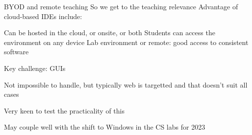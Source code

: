 \documentclass[aspectratio=169,t]{beamer}
\begin{document}
\begin{dframe}{BYOD and remote teaching}
  \1 So we get to the teaching relevance
  \1 Advantage of cloud-based IDEs include:
  
  \2 Can be hosted in the cloud, or onsite, or both
  \2 Students can access the environment on any device
  \2 Lab environment or remote: good access to consistent software

  \1 Key challenge: GUIs
  
  \2 Not impossible to handle, but typically web is targetted
  \2 and that doesn't suit all cases

  \1 Very keen to test the practicality of this
  
  \2 May couple well with the shift to Windows in the CS labs for 2023
\end{dframe}

\begin{comment}
\begin{dframe}{FaaS, serverless and responsiveness}
  \1 Edge appearance
\end{dframe}
\end{comment}
\end{document}
